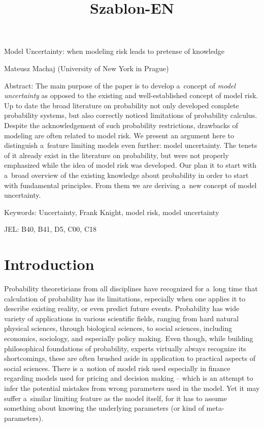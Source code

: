 \setcounter{secnumdepth}{1}



\title{Szablon-EN}



Model Uncertainty: when modeling risk leads to pretense of knowledge





Mateusz Machaj (University of New York in Prague)



Abstract: The main purpose of the paper is to develop a~concept of \textit{model uncertainty} as opposed to the existing and well-established concept of model risk. Up to date the broad literature on probability not only developed complete probability systems, but also correctly noticed limitations of probability calculus. Despite the acknowledgement of such probability restrictions, drawbacks of modeling are often related to model risk. We present an argument here to distinguish a~feature limiting models even further: model uncertainty. The tenets of it already exist in the literature on probability, but were not properly emphasized while the idea of model risk was developed. Our plan it to start with a~broad overview of the existing knowledge about probability in order to start with fundamental principles. From them we are deriving a~new concept of model uncertainty.



Keywords: Uncertainty, Frank Knight, model risk, model uncertainty



JEL: B40, B41, D5, C00, C18



\section{Introduction}

Probability theoreticians from all disciplines have recognized for a~long time that calculation of probability has its limitations, especially when one applies it to describe existing reality, or even predict future events. Probability has wide variety of applications in various scientific fields, ranging from hard natural physical sciences, through biological sciences, to social sciences, including economics, sociology, and especially policy making. Even though, while building philosophical foundations of probability, experts virtually always recognize its shortcomings, these are often brushed aside in application to practical aspects of social sciences. There is a~notion of model risk used especially in finance regarding models used for pricing and decision making -- which is an attempt to infer the potential mistakes from wrong parameters used in the model. Yet it may suffer a~similar limiting feature as the model itself, for it has to assume something about knowing the underlying parameters (or kind of meta-parameters).



